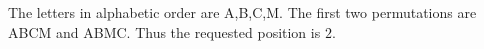 The letters in alphabetic order are A,B,C,M. The first two permutations are ABCM and ABMC. Thus the requested position is $\boxed2$.
